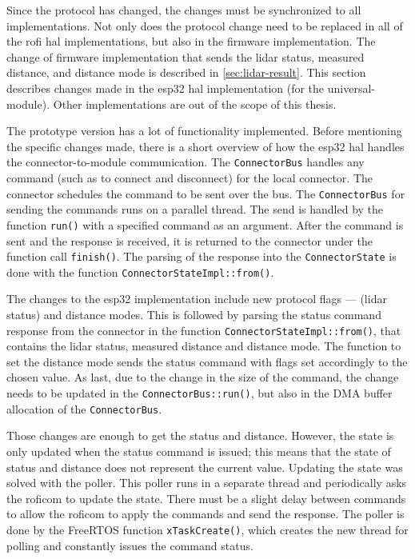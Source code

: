 \documentclass[
  digital,     %
  oneside,     %
  nosansbold,  %
  nocolorbold, %
  nolof,         %
  nolot,         %
]{fithesis4}
\begin{document}
Since the protocol has changed, the changes must be synchronized to all implementations. Not only
does the protocol change need to be replaced in all of the \acrshort{rofi} \acrshort{hal}
implementations, but also in the firmware implementation. The change of firmware implementation that
sends the \acrshort{lidar} status, measured distance, and distance mode is described in
\autoref{sec:lidar-result}. This section describes changes made in the esp32 \acrshort{hal}
implementation (for the \gls{universal-module}). Other implementations are out of the scope of this
thesis.

The prototype version has a lot of functionality implemented. Before mentioning the specific changes
made, there is a short overview of how the esp32 \acrshort{hal} handles the connector-to-module
communication. The \lstinline|ConnectorBus| handles any command (such as to connect and disconnect)
for the local connector. The connector schedules the command to be sent over the bus. The
\lstinline|ConnectorBus| for sending the commands runs on a parallel thread. The send is handled by
the function \lstinline|run()| with a specified command as an argument. After the command is sent
and the response is received, it is returned to the connector under the function call
\lstinline|finish()|. The parsing of the response into the \lstinline|ConnectorState| is done with
the function \lstinline|ConnectorStateImpl::from()|.

The changes to the esp32 implementation include new protocol flags --- (\acrshort{lidar} status) and
distance modes. This is followed by parsing the status command response from the connector in the
function \lstinline|ConnectorStateImpl::from()|, that contains the \acrshort{lidar} status, measured
distance and distance mode. The function to set the distance mode sends the status command with
flags set accordingly to the chosen value. As last, due to the change in the size of the command,
the change needs to be updated in the \lstinline|ConnectorBus::run()|, but also in the DMA buffer
allocation of the \lstinline|ConnectorBus|.

Those changes are enough to get the status and distance. However, the state is only updated when the
status command is issued; this means that the state of status and distance does not represent the
current value. Updating the state was solved with the poller. This poller runs in a separate thread
and periodically asks the \acrshort{roficom} to update the state. There must be a slight delay
between commands to allow the \acrshort{roficom} to apply the commands and send the response. The
poller is done by the FreeRTOS function \lstinline|xTaskCreate()|, which creates the new thread for
polling and constantly issues the command status.
\end{document}
